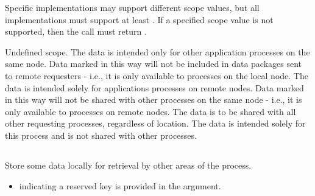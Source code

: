 Specific implementations may support different scope values, but all implementations must support at least .
If a specified scope value is not supported, then the  call must return .

\begin{constantdesc}
%
Undefined scope.
%
The data is intended only for other application processes on the same node.
Data marked in this way will not be included in data packages sent to remote requesters - i.e., it is only available to processes on the local node.
%
The data is intended solely for applications processes on remote nodes.
Data marked in this way will not be shared with other processes on the same node - i.e., it is only available to  processes on remote nodes.
%
The data is to be shared with all other requesting processes, regardless of location.
%
The data is intended solely for this process and is not shared with other processes.
%
\end{constantdesc}


\subsection{}

\summary

Store some data locally for retrieval by other areas of the process.

\format


\begin{arglist}
\end{arglist}

\returnstart
\begin{itemize}
\item {} indicating a reserved key is provided in the  argument.
\end{itemize}
\returnend

